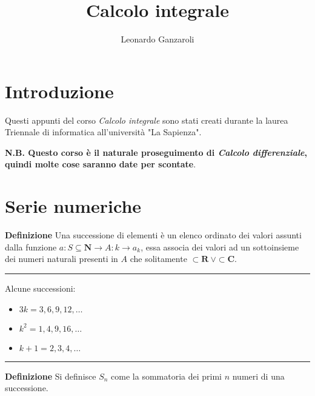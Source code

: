 \documentclass{article}
\title{Calcolo integrale}
\author{Leonardo Ganzaroli}
\date{}
\begin{document}
\maketitle


\tableofcontents

\newpage

\hypersetup{allcolors=black}

\section*{Introduzione}

Questi appunti del corso \textit{Calcolo integrale} sono stati creati durante la laurea Triennale di informatica all'università "La Sapienza".\newline

\noindent \textbf{N.B. Questo corso è il naturale proseguimento di \textit{Calcolo differenziale}, quindi molte cose saranno date per scontate}.

\newpage

\section{Serie numeriche}

\noindent\textbf{Definizione} Una successione di elementi è un elenco ordinato dei valori assunti dalla funzione $a:S\subseteq\mathbf{N}\rightarrow A:k\rightarrow a_k$, essa associa dei valori ad un sottoinsieme dei numeri naturali presenti in $A$ che solitamente $\subset\mathbf{R}\ \vee \subset\mathbf{C}$.\newline

\noindent\rule{\textwidth}{0.5pt}

\noindent Alcune successioni:
\begin{itemize}
    \item $3k=3,6,9,12,\ldots$
    \item $k^2=1,4,9,16,\ldots$
    \item $k+1=2,3,4,\ldots$
\end{itemize}

\noindent\rule{\textwidth}{0.5pt}\newline

\noindent\textbf{Definizione} Si definisce $S_n$ come la sommatoria dei primi $n$ numeri di una successione.\newline
\end{document}
